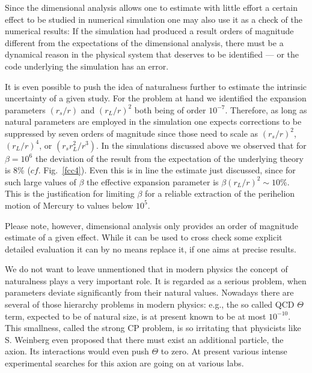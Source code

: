 \documentclass[12pt,ngerman,american]{iopart}
\begin{document}
Since the dimensional analysis allows one to estimate with little effort a certain effect to be studied in numerical simulation
one may also use it as a check of the numerical results: If the simulation had produced a result orders of magnitude different
from the expectations of the dimensional analysis, there must be a dynamical reason in the physical system that deserves to be identified --- or the code underlying the simulation has an error.

It is even possible to push the idea of naturalness further to estimate the intrinsic uncertainty of a given study.
For the problem at hand we identified the expansion parameters $(r_s/r)$ and $(r_L/r)^2$ both being of order $10^{-7}$.
Therefore, as long as natural parameters are employed in the simulation one expects corrections to be suppressed by
seven orders of magnitude since those need to scale as $(r_s/r)^2$, $(r_L/r)^4$, or $(r_s r_L^2/r^3)$.
In the simulations discussed above we observed that for $\beta=10^6$ the deviation of the result from the expectation
of the underlying theory is 8\% ($cf$. Fig.~\ref{fcc4}). Even this is in line the estimate just discussed, since
for such large values of $\beta$ the effective expansion parameter is $\beta(r_L/r)^2\sim 10$\%. This is the
justification for limiting $\beta$ for a reliable extraction of the perihelion motion of Mercury to values below $10^5$.

Please note, however, dimensional analysis only provides an order of magnitude estimate of a given effect.
While it can be used to cross check some explicit detailed evaluation it can by no means replace it, if one
aims at precise results.

We do not want to leave unmentioned that in modern physics the concept of naturalness plays a very important role.
It is regarded as a serious problem, when parameters deviate significantly from their natural values.
Nowadays there are  several of those hierarchy problems in modern physics: e.g., the so called QCD $\Theta$ term,
expected to be of natural size, is at present known to be at most $10^{-10}$.
This smallness, called the strong CP problem, is so irritating that physicists like S. Weinberg even proposed that there must exist an additional particle, the axion.
Its interactions would even push $\Theta$ to zero.
At present various intense experimental searches for this axion are going on at various labs.



\end{document}
